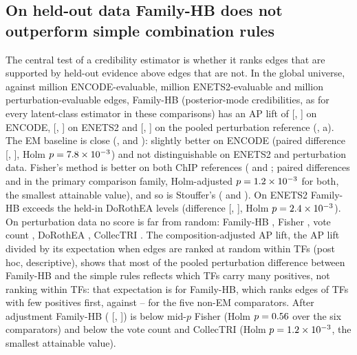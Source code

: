 \subsection{On held-out data Family-HB does not outperform simple combination rules}\label{sec:res-heldout}

The central test of a credibility estimator is whether it ranks edges that are supported by held-out evidence above edges that are not.
In the global universe, against \nHoNevalEncMio{} million ENCODE-evaluable, \nHoNevalEnetMio{} million ENETS2-evaluable and \nHoNevalPertMio{} million perturbation-evaluable edges, Family-HB (posterior-mode credibilities, as for every latent-class estimator in these comparisons) has an AP lift of \nApHbEnc{} [\nApHbEncLo{}, \nApHbEncHi{}] on ENCODE, \nApHbEnet{} [\nApHbEnetLo{}, \nApHbEnetHi{}] on ENETS2 and \nApHbPert{} [\nApHbPertLo{}, \nApHbPertHi{}] on the pooled perturbation reference (, a).
The EM baseline is close (\nApEmEnc{}, \nApEmEnet{} and \nApEmPert{}): slightly better on ENCODE (paired difference \nPairEmEnc{} [\nPairEmEncLo{}, \nPairEmEncHi{}], Holm $p=7.8\times10^{-3}{}$) and not distinguishable on ENETS2 and perturbation data.
Fisher's method is better on both ChIP references (\nApFiEnc{} and \nApFiEnet{}; paired differences \nPairFiEnc{} and \nPairFiEnet{} in the primary comparison family, Holm-adjusted $p=1.2\times10^{-3}{}$ for both, the smallest attainable value), and so is Stouffer's (\nApStEnc{} and \nApStEnet{}).
On ENETS2 Family-HB exceeds the held-in DoRothEA levels (difference \nPairDorEnet{} [\nPairDorEnetLo{}, \nPairDorEnetHi{}], Holm $p=2.4\times10^{-3}{}$).
On perturbation data no score is far from random: Family-HB \nApHbPert{}, Fisher \nApFiPert{}, vote count \nApVcPert{}, DoRothEA \nApDorPert{}, CollecTRI \nApColPert{}.
The composition-adjusted AP lift, the AP lift divided by its expectation when edges are ranked at random within TFs (post hoc, descriptive), shows that most of the pooled perturbation difference between Family-HB and the simple rules reflects which TFs carry many positives, not ranking within TFs: that expectation is \nCompNullHb{} for Family-HB, which ranks edges of TFs with few positives first, against \nCompNullCmpMin{}--\nCompNullCmpMax{} for the five non-EM comparators.
After adjustment Family-HB (\nAdjHb{} [\nAdjHbLo{}, \nAdjHbHi{}]) is \nPairAdjFi{} below mid-$p$ Fisher (Holm $p=0.56{}$ over the six comparators) and \nPairAdjVcCol{} below the vote count and CollecTRI (Holm $p=1.2\times10^{-3}{}$, the smallest attainable value).
